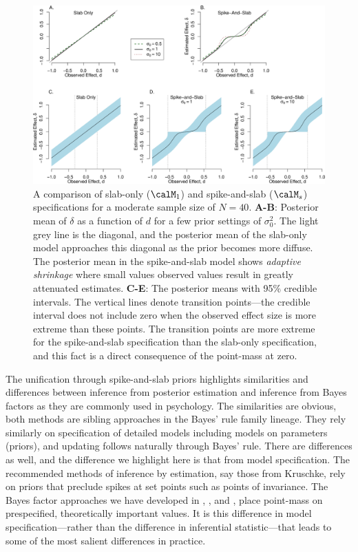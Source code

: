 \begin{figure}[!t]
\includegraphics[width=\textwidth]{figs/bi4_fig5}
\caption{A comparison of slab-only ($\calM_1$) and spike-and-slab ($\calM_s$) specifications for a moderate sample size of $N=40$.  \textbf{A-B}: Posterior mean of $\delta$ as a function of $d$ for a few prior settings of $\sigma_0^2$.  The light grey line is the diagonal, and the posterior mean of the slab-only model approaches this diagonal as the prior becomes more diffuse.  The posterior mean in the spike-and-slab model shows {\em adaptive shrinkage} where small values observed values result in greatly attenuated estimates.  \textbf{C-E}: The posterior means with 95\% credible intervals.  The vertical lines denote transition points---the credible interval does not include zero when the observed effect size is more extreme than these points.  The transition points are more extreme for the spike-and-slab specification than the slab-only specification, and this fact is a direct consequence of the point-mass at zero.}
\label{est}
\end{figure}

The unification through spike-and-slab priors highlights similarities and differences between inference from posterior estimation and inference from Bayes factors as they are commonly used in psychology.  The similarities are obvious, both methods are sibling approaches in the Bayes' rule family lineage.  They rely similarly on specification of detailed models including models on parameters (priors), and updating follows naturally through Bayes' rule.  There are differences as well, and the difference we highlight here is that from model specification.  The recommended methods of inference by estimation, say those from Kruschke, rely on priors that preclude spikes at set points such as points of invariance.  The Bayes factor approaches we have developed in , ,  and , place point-mass on prespecified, theoretically important values.  It is this difference in model specification---rather than the difference in inferential statistic---that leads to some of the most salient differences in practice.

